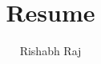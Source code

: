 \documentclass[]{article}
\begin{document}
	\title{\huge Resume}
	\author{\huge Rishabh Raj}
	\date{}
	\maketitle
\end{document}
